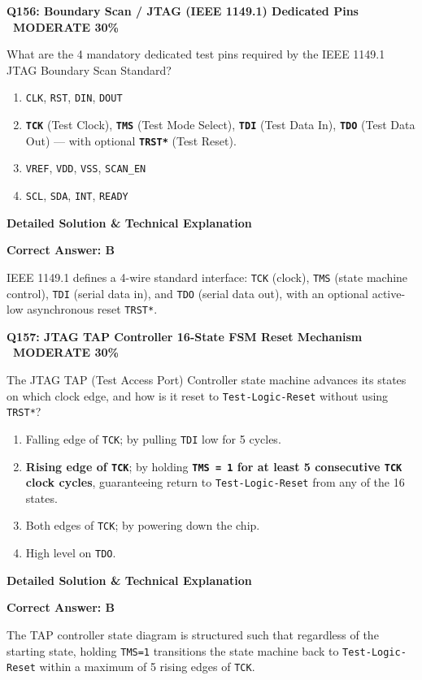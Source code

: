 \documentclass[11pt,a4paper]{article}
\newcommand{\badgemod}{{\color{white}\colorbox{modoran}{\bfseries\sffamily\tiny\ MODERATE 30\%\ }}}
\newenvironment{qbox}[2]{%
  \begin{mdframed}[style=qstyle]%
  {\bfseries\sffamily\color{primaryblue}#1 \hfill #2}\par\vspace{2pt}%
}{%
  \end{mdframed}%
}
\newenvironment{ansbox}{%
  \begin{mdframed}[style=ansstyle]%
  {\bfseries\sffamily\color{ansgreen}\small Detailed Solution \& Technical Explanation}\par\vspace{2pt}\small%
}{%
  \end{mdframed}%
}
\begin{document}
\begin{qbox}{Q156: Boundary Scan / JTAG (IEEE 1149.1) Dedicated Pins}{\badgemod}
What are the 4 mandatory dedicated test pins required by the IEEE 1149.1 JTAG Boundary Scan Standard?
\begin{enumerate}[label=\textbf{\Alph*.}]
  \item \texttt{CLK}, \texttt{RST}, \texttt{DIN}, \texttt{DOUT}
  \item \textbf{\texttt{TCK}} (Test Clock), \textbf{\texttt{TMS}} (Test Mode Select), \textbf{\texttt{TDI}} (Test Data In), \textbf{\texttt{TDO}} (Test Data Out) --- with optional \textbf{\texttt{TRST*}} (Test Reset).
  \item \texttt{VREF}, \texttt{VDD}, \texttt{VSS}, \texttt{SCAN\_EN}
  \item \texttt{SCL}, \texttt{SDA}, \texttt{INT}, \texttt{READY}
\end{enumerate}
\end{qbox}
\begin{ansbox}
\textbf{Correct Answer: B}

IEEE 1149.1 defines a 4-wire standard interface: \texttt{TCK} (clock), \texttt{TMS} (state machine control), \texttt{TDI} (serial data in), and \texttt{TDO} (serial data out), with an optional active-low asynchronous reset \texttt{TRST*}.
\end{ansbox}

\begin{qbox}{Q157: JTAG TAP Controller 16-State FSM Reset Mechanism}{\badgemod}
The JTAG TAP (Test Access Port) Controller state machine advances its states on which clock edge, and how is it reset to \texttt{Test-Logic-Reset} without using \texttt{TRST*}?
\begin{enumerate}[label=\textbf{\Alph*.}]
  \item Falling edge of \texttt{TCK}; by pulling \texttt{TDI} low for 5 cycles.
  \item \textbf{Rising edge of \texttt{TCK}}; by holding \textbf{\texttt{TMS = 1} for at least 5 consecutive \texttt{TCK} clock cycles}, guaranteeing return to \texttt{Test-Logic-Reset} from any of the 16 states.
  \item Both edges of \texttt{TCK}; by powering down the chip.
  \item High level on \texttt{TDO}.
\end{enumerate}
\end{qbox}
\begin{ansbox}
\textbf{Correct Answer: B}

The TAP controller state diagram is structured such that regardless of the starting state, holding \texttt{TMS=1} transitions the state machine back to \texttt{Test-Logic-Reset} within a maximum of 5 rising edges of \texttt{TCK}.
\end{ansbox}
\end{document}
